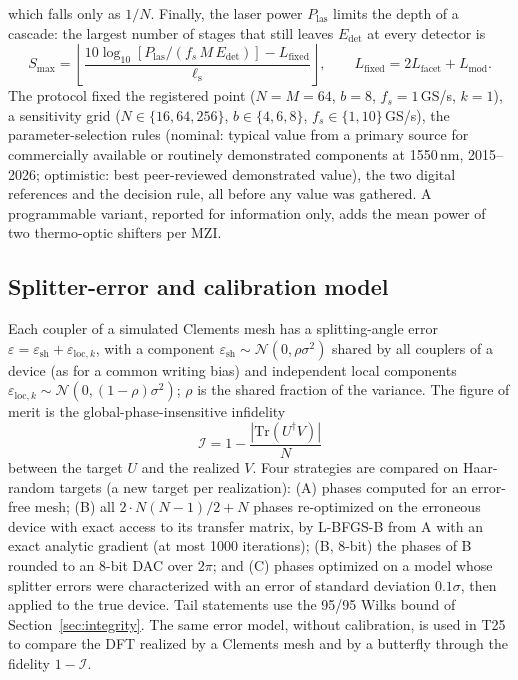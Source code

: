 \documentclass[11pt,a4paper]{article}
\begin{document}
which falls only as $1/N$. Finally, the laser power $P_\mathrm{las}$ limits the depth of a cascade: the largest number of stages that still leaves $E_\mathrm{det}$ at every detector is
\begin{equation}
S_\mathrm{max}=\left\lfloor\frac{10\log_{10}\!\left[P_\mathrm{las}/(f_s\,M\,E_\mathrm{det})\right]-L_\mathrm{fixed}}{\ell_\mathrm{s}}\right\rfloor,\qquad L_\mathrm{fixed}=2L_\mathrm{facet}+L_\mathrm{mod}.
\label{eq:maxdepth}
\end{equation}
The protocol fixed the registered point ($N=M=64$, $b=8$, $f_s=1$\,GS/s, $k=1$), a sensitivity grid ($N\in\{16,64,256\}$, $b\in\{4,6,8\}$, $f_s\in\{1,10\}$\,GS/s), the parameter-selection rules (nominal: typical value from a primary source for commercially available or routinely demonstrated components at 1550\,nm, 2015--2026; optimistic: best peer-reviewed demonstrated value), the two digital references and the decision rule, all before any value was gathered. A programmable variant, reported for information only, adds the mean power of two thermo-optic shifters per MZI.

\subsection{Splitter-error and calibration model}
\label{sec:calmodel}

Each coupler of a simulated Clements mesh has a splitting-angle error $\varepsilon=\varepsilon_\mathrm{sh}+\varepsilon_{\mathrm{loc},k}$, with a component $\varepsilon_\mathrm{sh}\sim\mathcal N(0,\rho\sigma^2)$ shared by all couplers of a device (as for a common writing bias) and independent local components $\varepsilon_{\mathrm{loc},k}\sim\mathcal N(0,(1-\rho)\sigma^2)$; $\rho$ is the shared fraction of the variance. The figure of merit is the global-phase-insensitive infidelity
\begin{equation}
\mathcal I=1-\frac{|\mathrm{Tr}(U^\dagger V)|}{N}
\label{eq:infidelity}
\end{equation}
between the target $U$ and the realized $V$. Four strategies are compared on Haar-random targets (a new target per realization): (A) phases computed for an error-free mesh; (B) all $2\cdot N(N-1)/2+N$ phases re-optimized on the erroneous device with exact access to its transfer matrix, by L-BFGS-B from A with an exact analytic gradient (at most 1000 iterations); (B, 8-bit) the phases of B rounded to an 8-bit DAC over $2\pi$; and (C) phases optimized on a model whose splitter errors were characterized with an error of standard deviation $0.1\sigma$, then applied to the true device. Tail statements use the 95/95 Wilks bound of Section~\ref{sec:integrity}. The same error model, without calibration, is used in T25 to compare the DFT realized by a Clements mesh and by a butterfly through the fidelity $1-\mathcal I$.
\end{document}
